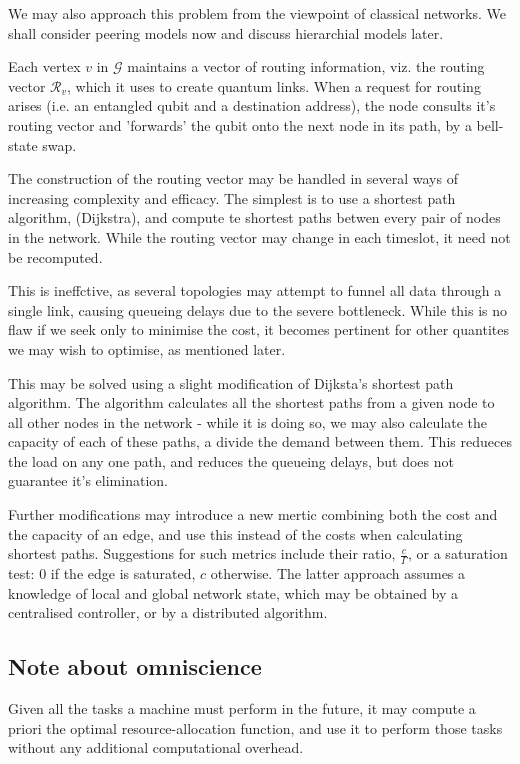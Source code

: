 \documentclass{amsart}
\begin{document}
    We may also approach this problem from the viewpoint of classical networks. We shall consider peering models now and discuss hierarchial models later. 

    Each vertex \(v\) in \(\mathcal{G}\) maintains a vector of routing information, viz. the routing vector \(\mathcal{R}_v\), which it uses to create quantum links. When a request for routing arises (i.e. an entangled qubit and a destination address), the node consults it's routing vector and 'forwards' the qubit onto the next node in its path, by a bell-state swap. 

    The construction of the routing vector may be handled in several ways of increasing complexity and efficacy. The simplest is to use a shortest path algorithm, (Dijkstra), and compute te shortest paths betwen every pair of nodes in the network. While the routing vector may change in each timeslot, it need not be recomputed. 
    
    This is ineffctive, as several topologies may attempt to funnel all data through a single link, causing queueing delays due to the severe bottleneck. While this is no flaw if we seek only to minimise the cost, it becomes pertinent for other quantites we may wish to optimise, as mentioned later.

    This may be solved using a slight modification of Dijksta's shortest path algorithm. The algorithm calculates all the shortest paths from a given node to all other nodes in the network - while it is doing so, we may also calculate the capacity of each of these paths, a divide the demand between them. This redueces the load on any one path, and reduces the queueing delays, but does not guarantee it's elimination.

    Further modifications may introduce a new mertic combining both the cost and the capacity of an edge, and use this instead of the costs when calculating shortest paths. Suggestions for such metrics include their ratio, \(\frac{c}{\Gamma}\), or a saturation test: 0 if the edge is saturated, \(c\) otherwise. The latter approach assumes a knowledge of local and global network state, which may be obtained by a centralised controller, or by a distributed algorithm. 

    \subsection{Note about omniscience}

    Given all the tasks a machine must perform in the future, it may compute a priori the optimal resource-allocation function, and use it to perform those tasks without any additional computational overhead. 
    
\end{document}
